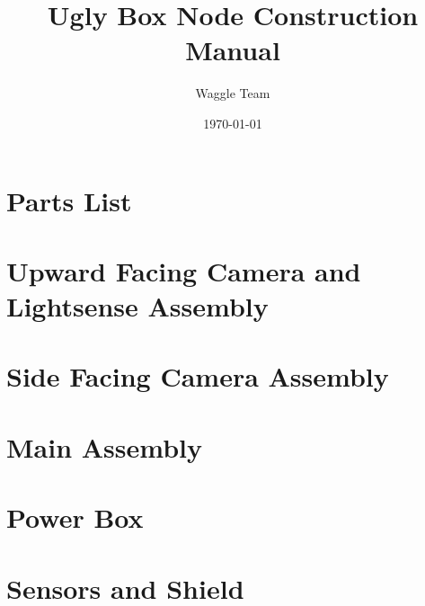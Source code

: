\documentclass{article}
\title{Ugly Box Node Construction Manual}
\author{Waggle Team}
\date{\today}
\begin{document}
\maketitle

\newpage


\section{Parts List}

\clearpage

\section{Upward Facing Camera and Lightsense Assembly}

\clearpage

\section{Side Facing Camera Assembly}

\clearpage

\section{Main Assembly}

\clearpage

\section{Power Box}

\clearpage

\section{Sensors and Shield}

\clearpage
\end{document}
